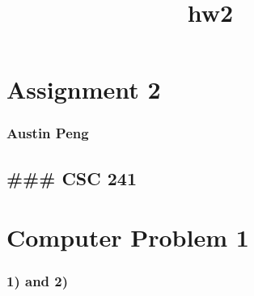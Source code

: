 \documentclass[11pt]{article}
\title{hw2}
\begin{document}
    
    
    \maketitle
    
    

    
    \section{Assignment 2}\label{assignment-2}

\subsubsection{Austin Peng}\label{austin-peng}

\subsection{\#\#\# CSC 241}\label{csc-241}

    \section{Computer Problem 1}\label{computer-problem-1}

    \subsubsection{1) and 2)}\label{and-2}
\end{document}
